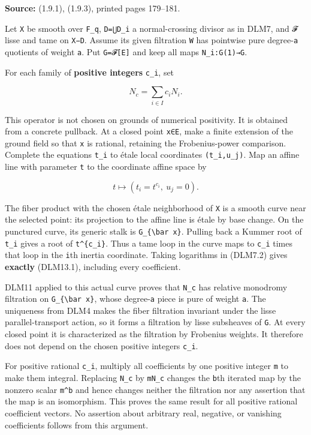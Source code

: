 \documentclass[
]{report}
\begin{document}
\textbf{Source:} (1.9.1), (1.9.3), printed pages 179--181.

Let \texttt{X} be smooth over \texttt{F\_q}, \texttt{D=⋃D\_i} a
normal-crossing divisor as in DLM7, and \texttt{𝓕} lisse and tame on
\texttt{X−D}. Assume its given filtration \texttt{W} has pointwise pure
degree-\texttt{a} quotients of weight \texttt{a}. Put
\texttt{G=𝓕{[}E{]}} and keep all maps \texttt{N\_i:G(1)→G}.

For each family of \textbf{positive integers} \texttt{c\_i}, set

\[
N_c=\sum_{i\in I}c_iN_i.
\tag{DLM13.1}
\]

This operator is not chosen on grounds of numerical positivity. It is
obtained from a concrete pullback. At a closed point \texttt{x∈E}, make
a finite extension of the ground field so that \texttt{x} is rational,
retaining the Frobenius-power comparison. Complete the equations
\texttt{t\_i} to étale local coordinates \texttt{(t\_i,u\_j)}. Map an
affine line with parameter \texttt{t} to the coordinate affine space by

\[
t\longmapsto(t_i=t^{c_i},\ u_j=0).
\tag{DLM13.2}
\]

The fiber product with the chosen étale neighborhood of \texttt{X} is a
smooth curve near the selected point: its projection to the affine line
is étale by base change. On the punctured curve, its generic stalk is
\texttt{G\_\{\textbackslash{}bar\ x\}}. Pulling back a Kummer root of
\texttt{t\_i} gives a root of \texttt{t\^{}\{c\_i\}}. Thus a tame loop
in the curve maps to \texttt{c\_i} times that loop in the \texttt{i}th
inertia coordinate. Taking logarithms in (DLM7.2) gives \textbf{exactly}
(DLM13.1), including every coefficient.

DLM11 applied to this actual curve proves that \texttt{N\_c} has
relative monodromy filtration on \texttt{G\_\{\textbackslash{}bar\ x\}},
whose degree-\texttt{a} piece is pure of weight \texttt{a}. The
uniqueness from DLM4 makes the fiber filtration invariant under the
lisse parallel-transport action, so it forms a filtration by lisse
subsheaves of \texttt{G}. At every closed point it is characterized as
the filtration by Frobenius weights. It therefore does not depend on the
chosen positive integers \texttt{c\_i}.

For positive rational \texttt{c\_i}, multiply all coefficients by one
positive integer \texttt{m} to make them integral. Replacing
\texttt{N\_c} by \texttt{mN\_c} changes the \texttt{b}th iterated map by
the nonzero scalar \texttt{m\^{}b} and hence changes neither the
filtration nor any assertion that the map is an isomorphism. This proves
the same result for all positive rational coefficient vectors. No
assertion about arbitrary real, negative, or vanishing coefficients
follows from this argument.
\end{document}
